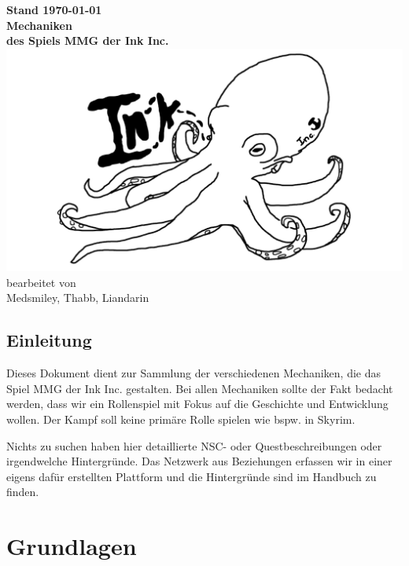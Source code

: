 \documentclass[a4paper,12pt,%
headsepline,%
numbers=noenddot,%
]{scrreprt}
\begin{document}
\begin{titlepage}
	\centering
	\vfill
	\Large{\textbf{Stand {\today}}} \\ \bigskip
	\vfill
	\textsf{\textbf{\Huge{Mechaniken}}} \\ \bigskip
	\Large{\textbf{des Spiels MMG der Ink Inc.}} \\ \bigskip
	\vfill
	\includegraphics[width=\linewidth]{Abbildungen/logo.png} \\ \bigskip
	\vfill
	\large
	bearbeitet von\\
	Medsmiley, Thabb, Liandarin \\ \bigskip
\end{titlepage}

\tableofcontents



\chapter*{Einleitung}
Dieses Dokument dient zur Sammlung der verschiedenen Mechaniken, die das Spiel MMG der Ink Inc. gestalten.
Bei allen Mechaniken sollte der Fakt bedacht werden, dass wir ein Rollenspiel mit Fokus auf die Geschichte und Entwicklung wollen.
Der Kampf soll keine primäre Rolle spielen wie bspw. in Skyrim.

Nichts zu suchen haben hier detaillierte NSC- oder Questbeschreibungen oder irgendwelche Hintergründe.
Das Netzwerk aus Beziehungen erfassen wir in einer eigens dafür erstellten Plattform und die Hintergründe sind im Handbuch zu finden.

\part{Grundlagen}





\end{document}
